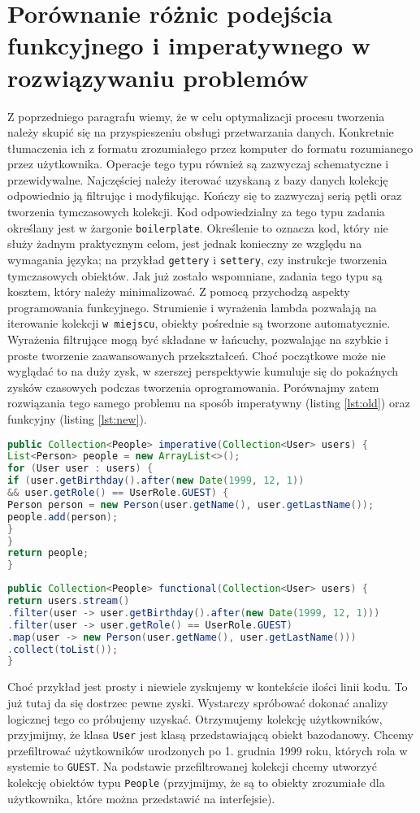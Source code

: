\documentclass[a4paper,10pt]{report}
\begin{document}
\section{Porównanie różnic podejścia funkcyjnego i imperatywnego w rozwiązywaniu problemów}
Z poprzedniego paragrafu wiemy, że w celu optymalizacji procesu tworzenia należy skupić się na przyspieszeniu obsługi przetwarzania danych. Konkretnie tłumaczenia ich z formatu zrozumiałego przez komputer do formatu rozumianego przez użytkownika. Operacje tego typu również są zazwyczaj schematyczne i przewidywalne. Najczęściej należy iterować uzyskaną z bazy danych kolekcję odpowiednio ją filtrując i modyfikując. Kończy się to zazwyczaj serią pętli oraz tworzenia tymczasowych kolekcji. Kod odpowiedzialny za tego typu zadania określany jest w żargonie \verb|boilerplate|. Określenie to oznacza kod, który nie służy żadnym praktycznym celom, jest jednak konieczny ze względu na wymagania języka; na przykład \verb|gettery| i \verb|settery|, czy instrukcje tworzenia tymczasowych obiektów. Jak już zostało wspomniane, zadania tego typu są kosztem, który należy minimalizować. Z pomocą przychodzą aspekty programowania funkcyjnego. Strumienie i wyrażenia lambda pozwalają na iterowanie kolekcji \verb|w miejscu|, obiekty pośrednie są tworzone automatycznie. Wyrażenia filtrujące mogą być składane w łańcuchy, pozwalając na szybkie i proste tworzenie zaawansowanych przekształceń. Choć początkowe może nie wyglądać to na duży zysk, w szerszej perspektywie kumuluje się do pokaźnych zysków czasowych podczas tworzenia oprogramowania. Porównajmy zatem rozwiązania tego samego problemu na sposób imperatywny (listing \ref{lst:old}) oraz funkcyjny (listing \ref{lst:new}).
\begin{lstlisting}[caption={Podejście imperatywne, język Java},label={lst:old},language=Java]
public Collection<People> imperative(Collection<User> users) {
List<Person> people = new ArrayList<>();
for (User user : users) {
if (user.getBirthday().after(new Date(1999, 12, 1))
&& user.getRole() == UserRole.GUEST) {
Person person = new Person(user.getName(), user.getLastName());
people.add(person);
}
}
return people;
}
\end{lstlisting}
\begin{lstlisting}[caption={Podejście funkcyjne, język Java z użyciem strumieni},label={lst:new},language=Java]
public Collection<People> functional(Collection<User> users) {
return users.stream()
.filter(user -> user.getBirthday().after(new Date(1999, 12, 1)))
.filter(user -> user.getRole() == UserRole.GUEST)
.map(user -> new Person(user.getName(), user.getLastName()))
.collect(toList());
}
\end{lstlisting}
Choć przykład jest prosty i niewiele zyskujemy w kontekście ilości linii kodu. To już tutaj da się dostrzec pewne zyski. Wystarczy spróbować dokonać analizy logicznej tego co próbujemy uzyskać. Otrzymujemy kolekcję użytkowników, przyjmijmy, że klasa \verb|User| jest klasą przedstawiającą obiekt bazodanowy. Chcemy przefiltrować użytkowników urodzonych po 1. grudnia 1999 roku, których rola w systemie to \verb|GUEST|. Na podstawie przefiltrowanej kolekcji chcemy utworzyć kolekcję obiektów typu \verb|People| (przyjmijmy, że są to obiekty zrozumiałe dla użytkownika, które można przedstawić na interfejsie).
\end{document}
